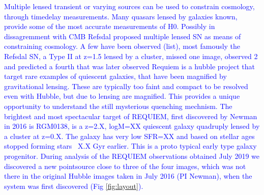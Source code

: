 \documentclass[12pt,dvipsnames]{article}
\newcommand{\outline}[1]{\textcolor{blue}{#1}}
\newcommand{\outline}[1]{}
\begin{document}
\outline{
Multiple lensed transient or varying sources can be used to constrain cosmology, through timedelay measurements.  Many quasars lensed by galaxies known, provide some of the most accurate measurements of H0.  Possibly in dissagremment with CMB }
\newline
\newline
\outline{
Refsdal proposed multiple lensed SN as means of constraining cosmology. A few have been observed (list), most famously the Refsdal SN, a Type II at z=1.5 lensed by a cluster, missed one image, observed 2 and predicted a fourth that was later observed
}\newline
\newline
\outline{
Requiem is a hubble project that target rare examples of quiescent galaxies, that have been magnified by gravitational lensing. These are typically too faint and compact to be resolved even with Hubble, but due to lensing are magnified. This provides a unique opportunity to  understand the still mysterious quenching mechnism. 
The brightest and most spectacular target of REQUIEM, first discovered by Newman in 2016 is RGM0138, is a z=2.X, logM=XX quiescent galaxy quadruply lensed by a cluster at z=0.X. The galaxy has very low SFR=XX and based on stellar ages stopped forming stars ~X.X Gyr earlier. This is a proto typical early type galaxy progenitor.
}
\newline
\newline
\outline{
During analysis of the REQUIEM observations obtained  July 2019 we discovered a new pointsource close to three of the four images, which was not there in the original Hubble images taken in July 2016 (PI Newman), when the system was first discovered (Fig \ref{fig:layout}). 
}
\newline
\newline
\end{document}
